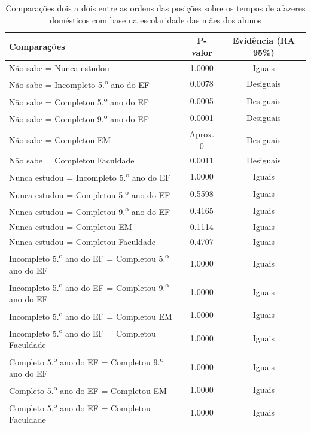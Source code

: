 \begin{table}[htb]
    \centering
\caption{Comparações dois a dois entre as ordens das posições sobre os tempos de afazeres domésticos
com base na escolaridade das mães dos alunos\label{tab:esc_mae_afzr}}
    \begin{tabular}{lcc}
    \toprule
    Comparações & P-valor & Evidência (RA 95\%)\\
    \midrule \midrule
    Não sabe = Nunca estudou & 1.0000 & Iguais\\
    Não sabe = Incompleto 5.\textsuperscript{o} ano do EF  & 0.0078 & Desiguais\\
    Não sabe = Completou 5.\textsuperscript{o} ano do EF  & 0.0005 & Desiguais\\
    Não sabe = Completou 9.\textsuperscript{o} ano do EF  & 0.0001 & Desiguais\\
    Não sabe = Completou EM & Aprox. 0 & Desiguais\\
    Não sabe = Completou Faculdade & 0.0011 & Desiguais\\
    
    Nunca estudou = Incompleto 5.\textsuperscript{o} ano do EF  & 1.0000 & Iguais\\
    Nunca estudou = Completou 5.\textsuperscript{o} ano do EF  & 0.5598 & Iguais\\
    Nunca estudou = Completou 9.\textsuperscript{o} ano do EF  & 0.4165 & Iguais\\
    Nunca estudou = Completou EM & 0.1114 & Iguais\\
    Nunca estudou = Completou Faculdade & 0.4707 & Iguais\\
    
    Incompleto 5.\textsuperscript{o} ano do EF = Completou 5.\textsuperscript{o} ano do EF  & 1.0000 & Iguais\\
    Incompleto 5.\textsuperscript{o} ano do EF = Completou 9.\textsuperscript{o} ano do EF  & 1.0000 & Iguais\\
    Incompleto 5.\textsuperscript{o} ano do EF = Completou EM & 1.0000 & Iguais\\
    Incompleto 5.\textsuperscript{o} ano do EF = Completou Faculdade & 1.0000 & Iguais\\
    
    Completo 5.\textsuperscript{o} ano do EF = Completou 9.\textsuperscript{o} ano do EF  & 1.0000 & Iguais\\
    Completo 5.\textsuperscript{o} ano do EF = Completou EM & 1.0000 & Iguais\\
    Completo 5.\textsuperscript{o} ano do EF = Completou Faculdade & 1.0000 & Iguais\\
    

\end{tabular}
\end{table}
